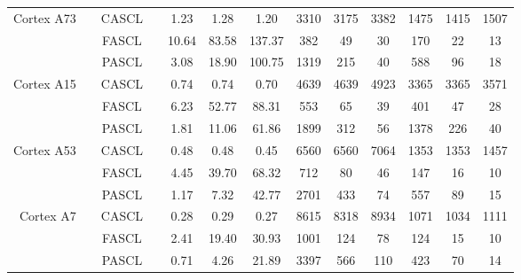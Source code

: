 \begin{table}[t]
{{\begin{tabular}{r|c|c|c c c c| c c c| c c c}
      \hline
      \multirow{3}{*}{\begin{minipage}{0.5in}\centering Cortex A73\end{minipage}} & \multirow{3}{*}{\begin{minipage}{0.5in}\centering 2360\end{minipage}} 
        & CASCL &                     &  1.23  & 1.28   & 1.20   & 3310 & 3175 & 3382 & 1475 & 1415 & 1507 \\
      & & FASCL &                     &  10.64 & 83.58  & 137.37 & 382  & 49   & 30   & 170  & 22   & 13   \\
      & & PASCL &                     &  3.08  & 18.90  & 100.75 & 1319 & 215  & 40   & 588  & 96   & 18   \\

      \hline
      \multirow{3}{*}{\begin{minipage}{0.5in}\centering Cortex A15\end{minipage}} & \multirow{3}{*}{\begin{minipage}{0.5in}\centering 2000\end{minipage}} 
        & CASCL &                     &  0.74  & 0.74   & 0.70   & 4639 & 4639 & 4923 & 3365 & 3365 & 3571 \\
      & & FASCL &                     &  6.23  & 52.77  & 88.31  & 553  & 65   & 39   & 401  & 47   & 28   \\
      & & PASCL &                     &  1.81  & 11.06  & 61.86  & 1899 & 312  & 56   & 1378 & 226  & 40   \\

      \hline
      \multirow{3}{*}{\begin{minipage}{0.5in}\centering Cortex A53\end{minipage}} & \multirow{3}{*}{\begin{minipage}{0.5in}\centering 1840\end{minipage}} 
        & CASCL &                     &  0.48  & 0.48   & 0.45   & 6560 & 6560 & 7064 & 1353 & 1353 & 1457 \\
      & & FASCL &                     &  4.45  & 39.70  & 68.32  & 712  & 80   & 46   & 147  & 16   & 10   \\
      & & PASCL &                     &  1.17  & 7.32   & 42.77  & 2701 & 433  & 74   & 557  & 89   & 15   \\

      \hline
      \multirow{3}{*}{\begin{minipage}{0.5in}\centering Cortex A7\end{minipage}} & \multirow{3}{*}{\begin{minipage}{0.5in}\centering 1400\end{minipage}} 
        & CASCL &                     &  0.28  & 0.29   & 0.27   & 8615 & 8318 & 8934 & 1071 & 1034 & 1111 \\
      & & FASCL &                     &  2.41  & 19.40  & 30.93  & 1001 & 124  & 78   & 124  & 15   & 10   \\
      & & PASCL &                     &  0.71  & 4.26   & 21.89  & 3397 & 566  & 110  & 423  & 70   & 14   \\


\end{tabular}}}
\end{table}
